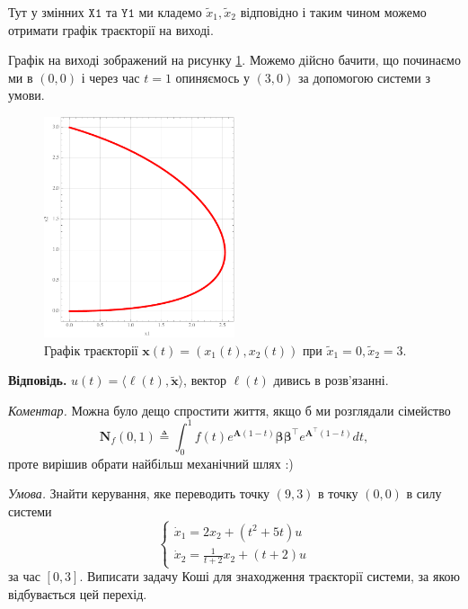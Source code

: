 \documentclass[oneside,solution]{karazin-control-assign}
\begin{document}
Тут у змінних $\mathtt{X1}$ та $\mathtt{Y1}$ ми кладемо $\widetilde{x}_1,\widetilde{x}_2$ відповідно і таким чином можемо отримати графік траєкторії на виході.

Графік на виході зображений на рисунку \ref{fig:problem-1}. Можемо дійсно бачити, що починаємо ми в $(0,0)$ і через час $t=1$ опиняємось у $(3,0)$ за допомогою системи з умови.
\begin{figure}
    \centering
    \includegraphics[width=0.5\textwidth]{plot_1.pdf}
    \caption{Графік траєкторії $\mathbf{x}(t)=(x_1(t),x_2(t))$ при $\widetilde{x}_1=0,\widetilde{x}_2=3$.}
    \label{fig:problem-1}
\end{figure}

\textbf{Відповідь.} $u(t) = \langle \boldsymbol{\ell}(t),\widetilde{\boldsymbol{x}}\rangle$, вектор $\boldsymbol{\ell}(t)$ дивись в розв'язанні.

\textit{Коментар.} Можна було дещо спростити життя, якщо б ми розглядали сімейство
\begin{equation}
    \boldsymbol{N}_f(0,1) \triangleq \int_0^1 f(t)e^{\boldsymbol{A}(1-t)}\boldsymbol{\beta}\boldsymbol{\beta}^{\top}e^{\boldsymbol{A}^{\top}(1-t)}dt,
\end{equation}
проте вирішив обрати найбільш механічний шлях :)


\hspace{20px}\textit{Умова.} Знайти керування, яке переводить точку $(9,3)$ в точку $(0,0)$ в силу системи
\begin{equation}
    \begin{cases}
        \dot{x}_1 = 2x_2 + (t^2+5t)u \\
        \dot{x}_2 = \frac{1}{t+2}x_2 + (t+2)u
    \end{cases}
\end{equation}
за час $[0,3]$. Виписати задачу Коші для знаходження траєкторії системи, за якою відбувається цей перехід.
\end{document}

